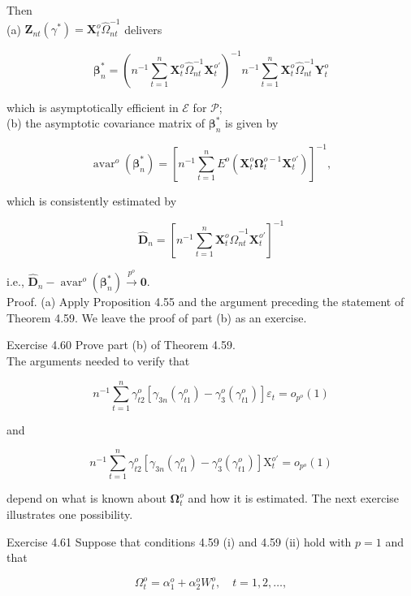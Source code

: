 \documentclass[10pt]{article}
\begin{document}
Then\\
(a) $\mathbf{Z}_{n t}\left(\gamma^{*}\right)=\mathbf{X}_{t}^{o} \hat{\Omega}_{n t}^{-1}$ delivers

$$
\boldsymbol{\beta}_{n}^{*}=\left(n^{-1} \sum_{t=1}^{n} \mathbf{X}_{t}^{o} \hat{\Omega}_{n t}^{-1} \mathbf{X}_{t}^{o \prime}\right)^{-1} n^{-1} \sum_{t=1}^{n} \mathbf{X}_{t}^{o} \hat{\Omega}_{n t}^{-1} \mathbf{Y}_{t}^{o}
$$

which is asymptotically efficient in $\mathcal{E}$ for $\mathcal{P}$;\\
(b) the asymptotic covariance matrix of $\boldsymbol{\beta}_{n}^{*}$ is given by

$$
\operatorname{avar}^{o}\left(\boldsymbol{\beta}_{n}^{*}\right)=\left[n^{-1} \sum_{t=1}^{n} E^{o}\left(\mathbf{X}_{t}^{o} \boldsymbol{\Omega}_{t}^{o-1} \mathbf{X}_{t}^{o \prime}\right)\right]^{-1},
$$

which is consistently estimated by

$$
\hat{\mathbf{D}}_{n}=\left[n^{-1} \sum_{t=1}^{n} \mathbf{X}_{t}^{o} \hat{\Omega}_{n t}^{-1} \mathbf{X}_{t}^{o \prime}\right]^{-1}
$$

i.e., $\hat{\mathbf{D}}_{n}-\operatorname{avar}^{o}\left(\boldsymbol{\beta}_{n}^{*}\right) \xrightarrow{p^{o}} \mathbf{0}$.\\
Proof. (a) Apply Proposition 4.55 and the argument preceding the statement of Theorem 4.59. We leave the proof of part (b) as an exercise.

Exercise 4.60 Prove part (b) of Theorem 4.59.\\
The arguments needed to verify that

$$
n^{-1} \sum_{t=1}^{n} \gamma_{t 2}^{o}\left[\gamma_{3 n}\left(\gamma_{t 1}^{o}\right)-\gamma_{3}^{o}\left(\gamma_{t 1}^{o}\right)\right] \varepsilon_{t}=o_{p^{o}}(1)
$$

and

$$
n^{-1} \sum_{t=1}^{n} \gamma_{t 2}^{o}\left[\gamma_{3 n}\left(\gamma_{t 1}^{o}\right)-\gamma_{3}^{o}\left(\gamma_{t 1}^{o}\right)\right] \mathrm{X}_{t}^{o \prime}=o_{p^{o}}(1)
$$

depend on what is known about $\boldsymbol{\Omega}_{t}^{o}$ and how it is estimated. The next exercise illustrates one possibility.

Exercise 4.61 Suppose that conditions 4.59 (i) and 4.59 (ii) hold with $p=1$ and that

$$
\Omega_{t}^{o}=\alpha_{1}^{o}+\alpha_{2}^{o} W_{t}^{o}, \quad t=1,2, \ldots,
$$
\end{document}
